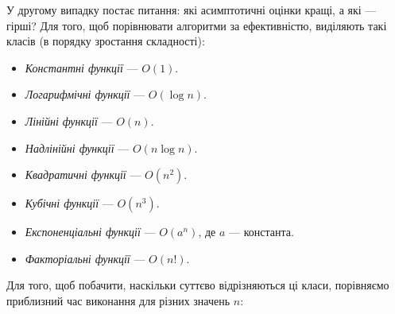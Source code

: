 \documentclass[12pt,a4paper]{report}
\begin{document}
У другому випадку постає питання: які асимптотичні оцінки кращі, а які --- гірші? Для того, щоб порівнювати алгоритми за ефективністю, виділяють такі \nextitemizecount{} класів (в порядку зростання складності):

\begin{itemize}
    \item \emph{Константні функції} --- \(O(1)\).
    \item \emph{Логарифмічні функції} --- \(O(\log{}n)\).
    \item \emph{Лінійні функції} --- \(O(n)\).
    \item \emph{Надлінійні функції} --- \(O(n\log{}n)\).
    \item \emph{Квадратичні функції} --- \(O(n^2)\).
    \item \emph{Кубічні функції} --- \(O(n^3)\).
    \item \emph{Експоненціальні функції} --- \(O(a^n)\), де \(a\) --- константа.
    \item \emph{Факторіальні функції} --- \(O(n!)\).
\end{itemize}

Для того, щоб побачити, наскільки суттєво відрізняються ці класи, порівняємо приблизний час виконання для різних значень \(n\):
\end{document}
